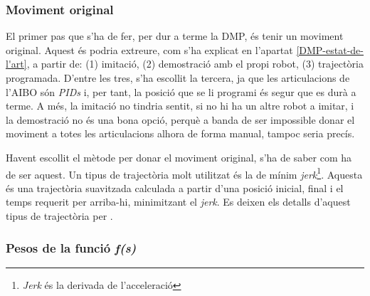 \documentclass[12pt,a4paper,final,twoside]{report}
\begin{document}
\subsubsection{Moviment original}

El primer pas que s'ha de fer, per dur a terme la DMP, és tenir un moviment original. Aquest és podria extreure, com s'ha explicat en l'apartat \ref{DMP-estat-de-l'art}, a partir de: (1) imitació, (2) demostració amb el propi robot, (3) trajectòria programada. D'entre les tres, s'ha escollit la tercera, ja que les articulacions de l'AIBO són \textit{PIDs} i, per tant, la posició que se li programi és segur que es durà a terme. A més, la imitació no tindria sentit, si no hi ha un altre robot a imitar, i la demostració no és una bona opció, perquè a banda de ser impossible donar el moviment a totes les articulacions alhora de forma manual, tampoc seria precís.

Havent escollit el mètode per donar el moviment original, s'ha de saber com ha de ser aquest. Un tipus de trajectòria molt utilitzat és la de mínim \textit{jerk}\footnote{\textit{Jerk} és la derivada de l'acceleració}. Aquesta és una trajectòria suavitzada calculada a partir d'una posició inicial, final i el temps requerit per arriba-hi, minimitzant el \textit{jerk}. Es deixen els detalls d'aquest tipus de trajectòria per \cite{Shadmehr2004}.

\subsubsection{Pesos de la funció \textit{f(s)}}
\end{document}
